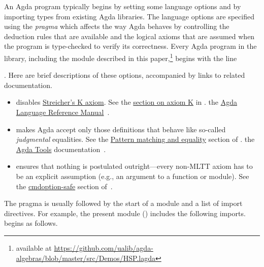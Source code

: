 An Agda program typically begins by setting some language options and by
importing types from existing Agda libraries. The language options are specified
using the {\footnotesize {}} \emph{pragma} which affects the way Agda behaves by controlling
the deduction rules that are available and the logical axioms
that are assumed when the program is type-checked to verify its
correctness. Every Agda program in the \agdaalgebras library, including the
module \DemosHSPlagda described in this paper,\footnote{available at \url{https://github.com/ualib/agda-algebras/blob/master/src/Demos/HSP.lagda}} begins with the line
\begin{code}[inline]%
\>[0]\AgdaSymbol{\{-\#}\AgdaSpace{}%
\AgdaSpace{}%
\AgdaSpace{}%
\AgdaSpace{}%
\AgdaSpace{}%
\AgdaSymbol{\#-\}}\<%
\end{code}
. Here are brief descriptions of these options, accompanied by links to related documentation.

\begin{itemize}
\item
{} disables \href{https://ncatlab.org/nlab/show/axiom+K+%28type+theory%29}{Streicher's K axiom}.
See the \href{https://agda.readthedocs.io/en/v2.6.1/language/without-k.html}{section on axiom K} in
\ifshort
\cite{agdaref-axiomk}.
\else
the \href{https://agda.readthedocs.io/en/v2.6.1.3/language}{Agda Language Reference Manual}~\cite{agdaref-axiomk}.
\fi

\item
{} makes Agda accept only those definitions that behave like so-called {\it judgmental} equalities.
See the \href{https://agda.readthedocs.io/en/v2.6.1/tools/command-line-options.html#pattern-matching-and-equality}%
{Pattern matching and equality} section of
\ifshort
\cite{agdatools-patternmatching}.
\else
the \href{https://agda.readthedocs.io/en/v2.6.1.3/tools/}{Agda Tools} documentation~\cite{agdatools-patternmatching}.
\fi

\item
{} ensures that nothing is postulated outright---every non-MLTT axiom has to be an explicit assumption (e.g., an argument to a function or module).
See the \href{https://agda.readthedocs.io/en/v2.6.1/tools/command-line-options.html#cmdoption-safe}{cmdoption-safe} section of~\cite{agdaref-safeagda}.
\end{itemize}


The {\footnotesize {}} pragma is usually followed by the start of a module and a list of
import directives. For example, the present module (\DemosHSPlagda)
\ifshort includes the following imports.
\else
begins as follows.
\fi

